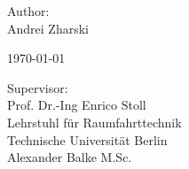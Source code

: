 \begin{titlepage}
\begin{center}
    \vspace{2cm}

    Author:\\
    Andrei Zharski

    \vspace{1cm}

    \today
\end{center}

\vfill

\begin{flushleft}
    Supervisor:\\
    Prof. Dr.-Ing Enrico Stoll\\
    Lehrstuhl für Raumfahrttechnik\\
    Technische Universität Berlin\\
    Alexander Balke M.Sc.
\end{flushleft}
\end{titlepage}


